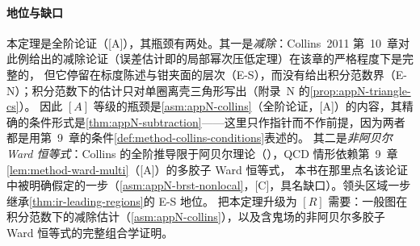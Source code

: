 \paragraph{地位与缺口}本定理是全阶论证（[A]），其瓶颈有两处。其一是\emph{减除}：Collins~2011 第~10~章对此例给出的减除论证（误差估计即\cite[第~10.7~节，式~(10.81)--(10.84)]{Collins2011}的局部幂次压低定理）在该章的严格程度下是完整的，
但它停留在标度陈述与钳夹面的层次（E-S），而没有给出积分范数界（E-N）；积分范数下的估计只对单圈离壳三角形写出（附录~N 的\cref{prop:appN-triangle-cs}）。
因此 $[A]$ 等级的瓶颈是\cref{asm:appN-collins}（全阶论证，[A]）的内容，其精确的条件形式是\cref{thm:appN-subtraction}——这里只作指针而不作前提，因为两者都是用第~9~章的条件\cref{def:method-collins-conditions}表述的。
其二是\emph{非阿贝尔 Ward 恒等式}：Collins 的全阶推导限于阿贝尔理论（\cite[第~10.8.3~节]{Collins2011}），QCD 情形依赖第~9~章\cref{lem:method-ward-multi}（[A]）的多胶子 Ward 恒等式，
本书在那里点名该论证中被明确假定的一步（\cref{asm:appN-brst-nonlocal}，[C]，具名缺口）。领头区域一步继承\cref{thm:ir-leading-regions}的 E-S 地位。
把本定理升级为 $[R]$ 需要：一般图在积分范数下的减除估计（\cref{asm:appN-collins}），以及含鬼场的非阿贝尔多胶子 Ward 恒等式的完整组合学证明。
